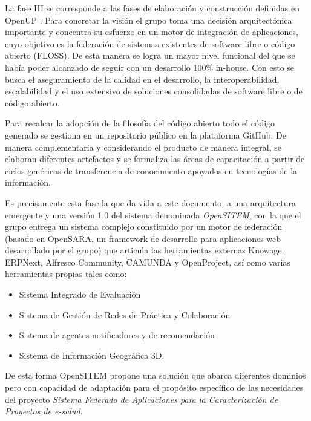 La fase III se corresponde a las fases de elaboración y construcción definidas en OpenUP \cite{balduino2010}. Para concretar la visión el grupo toma una decisión arquitectónica importante y concentra su esfuerzo en un motor de integración de aplicaciones, cuyo objetivo es la federación de sistemas existentes de software libre o código abierto (FLOSS). De esta manera se logra un mayor nivel funcional del que se había poder alcanzado de seguir con un desarrollo 100\% in-house. Con esto se busca el aseguramiento de la calidad en el desarrollo, la interoperabilidad, escalabilidad y el uso extensivo de soluciones consolidadas de software libre o de código abierto. 

Para recalcar la adopción de la filosofía del código abierto todo el código generado se gestiona en un repositorio público en la plataforma GitHub. De manera complementaria y considerando el producto de manera integral, se elaboran diferentes artefactos y se formaliza las áreas de capacitación a partir de ciclos genéricos de transferencia de conocimiento apoyados en tecnologías de la información.

Es precisamente esta fase la que da vida a este documento, a una arquitectura emergente y una versión 1.0 del sistema denominada \textit{OpenSITEM}, con la que el grupo entrega un sistema complejo constituido por un motor de federación (basado en OpenSARA, un framework de desarrollo para aplicaciones web desarrollado por el grupo) que articula las herramientas externas Knowage, ERPNext, Alfresco Community, CAMUNDA y OpenProject, así como varias herramientas propias tales como:

\begin{itemize}
\item Sistema Integrado de Evaluación
\item Sistema de Gestión de Redes de Práctica y Colaboración
\item Sistema de agentes notificadores y de recomendación
\item Sistema de Información Geográfica 3D.
\end{itemize}

De esta forma OpenSITEM propone una solución que abarca diferentes dominios pero con capacidad de adaptación para el propósito específico de las necesidades del proyecto \textit{Sistema Federado de Aplicaciones para la Caracterización de Proyectos de e-salud}.


